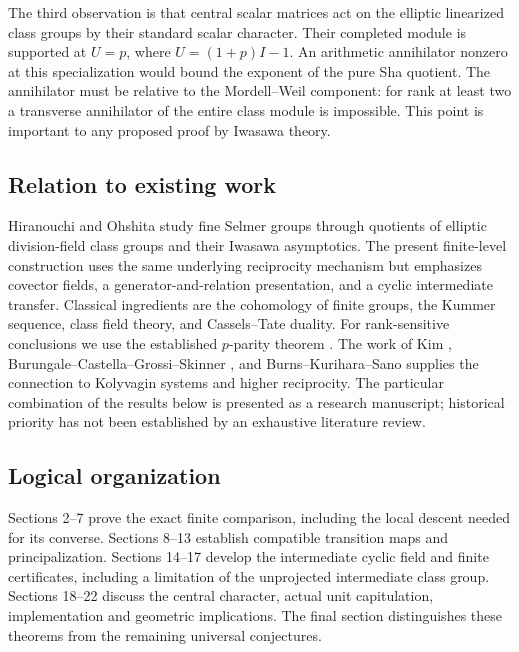 \documentclass[11pt,a4paper]{article}
\theoremstyle{definition}\newtheorem{definition}[theorem]{Definition}
\theoremstyle{remark}\newtheorem{remark}[theorem]{Remark}
\numberwithin{equation}{section}
\begin{document}
The third observation is that central scalar matrices act on the elliptic linearized class groups by their standard scalar character. Their completed module is supported at $U=p$, where $U=(1+p)I-1$. An arithmetic annihilator nonzero at this specialization would bound the exponent of the pure Sha quotient. The annihilator must be relative to the Mordell--Weil component: for rank at least two a transverse annihilator of the entire class module is impossible. This point is important to any proposed proof by Iwasawa theory.

\subsection*{Relation to existing work}
Hiranouchi and Ohshita \cite{HO} study fine Selmer groups through quotients of elliptic division-field class groups and their Iwasawa asymptotics. The present finite-level construction uses the same underlying reciprocity mechanism but emphasizes covector fields, a generator-and-relation presentation, and a cyclic intermediate transfer. Classical ingredients are the cohomology of finite groups, the Kummer sequence, class field theory, and Cassels--Tate duality. For rank-sensitive conclusions we use the established $p$-parity theorem \cite{DD}. The work of Kim \cite{Kim}, Burungale--Castella--Grossi--Skinner \cite{BCGS}, and Burns--Kurihara--Sano \cite{BKS} supplies the connection to Kolyvagin systems and higher reciprocity. The particular combination of the results below is presented as a research manuscript; historical priority has not been established by an exhaustive literature review.

\subsection*{Logical organization}
Sections 2--7 prove the exact finite comparison, including the local descent needed for its converse. Sections 8--13 establish compatible transition maps and principalization. Sections 14--17 develop the intermediate cyclic field and finite certificates, including a limitation of the unprojected intermediate class group. Sections 18--22 discuss the central character, actual unit capitulation, implementation and geometric implications. The final section distinguishes these theorems from the remaining universal conjectures.
\end{document}
